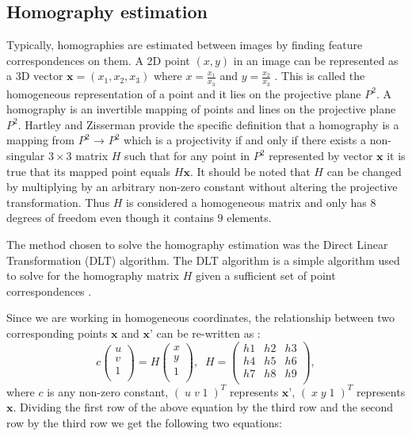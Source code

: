 
\subsection{Homography estimation} %
\label{sub:tracking_library_for_the_web:marker_less_tracking_algorithm:homography_estimation}

Typically, homographies are estimated between images by finding feature correspondences on them. A 2D point $(x,y)$ in an image can be represented as a 3D vector $\textbf{x} = (x_1, x_2, x_3)$ where $x = \frac{x_1}{x_3}$ and $y = \frac{x_2}{x_3}$ \cite{Homography2009}. This is called the homogeneous representation of a point and it lies on the projective plane $P^2$. A homography is an invertible mapping of points and lines on the projective plane $P^2$. Hartley and Zisserman \cite{Hartley2004} provide the specific definition that a homography is a mapping from $P^2$ → $P^2$ which is a projectivity if and only if there exists a non-singular $3\times3$ matrix $H$ such that for any point in $P^2$ represented by vector $\textbf{x}$ it is true that its mapped point equals $H\textbf{x}$. It should be noted that $H$ can be changed by multiplying by an arbitrary non-zero constant without altering the projective transformation. Thus $H$ is considered a homogeneous matrix and only has $8$ degrees of freedom even though it contains $9$ elements.

The method chosen to solve the homography estimation was the Direct Linear Transformation (DLT) \cite{Impa2009,Hartley2004} algorithm. The DLT algorithm is a simple algorithm used to solve for the homography matrix $H$ given a sufficient set of point correspondences \cite{Homography2009}.

Since we are working in homogeneous coordinates, the relationship between two corresponding points $\textbf{x}$ and $\textbf{x'}$ can be re-written as \cite{Homography2009}:
$$c\begin{pmatrix}u\\ v\\ 1\\\end{pmatrix} = H\begin{pmatrix}x\\ y\\ 1\\\end{pmatrix}, \;\; H=\begin{pmatrix}h1 & h2 & h3\\ h4 & h5 & h6\\ h7 & h8 & h9\\\end{pmatrix},$$
where $c$ is any non-zero constant, $(\; u \; v \; 1 \;)^T$ represents $\textbf{x'}$, $(\; x \; y \; 1 \;)^T$ represents $\textbf{x}$. Dividing the first row of the above equation by the third row and the second row by the third row we get the following two equations:

